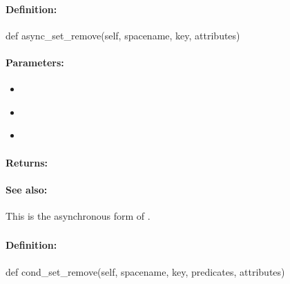 \paragraph{Definition:}
\begin{pythoncode}
def async_set_remove(self, spacename, key, attributes)
\end{pythoncode}

\paragraph{Parameters:}
\begin{itemize}[noitemsep]
\item {}\\

\item {}\\

\item {}\\

\end{itemize}

\paragraph{Returns:}


\paragraph{See also:}  This is the asynchronous form of .

\pagebreak
\subsubsection{}
\label{api:python:cond_set_remove}


\paragraph{Definition:}
\begin{pythoncode}
def cond_set_remove(self, spacename, key, predicates, attributes)
\end{pythoncode}

